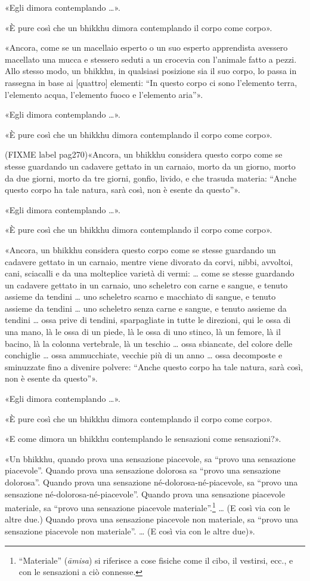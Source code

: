 «Egli dimora contemplando …».


«È pure così che un bhikkhu dimora contemplando il corpo come corpo».


«Ancora, come se un macellaio esperto o un suo esperto apprendista
avessero macellato una mucca e stessero seduti a un crocevia con
l’animale fatto a pezzi. Allo stesso modo, un bhikkhu, in qualsiasi
posizione sia il suo corpo, lo passa in rassegna in base ai [quattro]
elementi: “In questo corpo ci sono l’elemento terra, l’elemento acqua,
l’elemento fuoco e l’elemento aria”».


«Egli dimora contemplando …».


«È pure così che un bhikkhu dimora contemplando il corpo come corpo».


(FIXME label pag270)«Ancora, un bhikkhu considera questo corpo come se stesse guardando un
cadavere gettato in un carnaio, morto da un giorno, morto da due giorni,
morto da tre giorni, gonfio, livido, e che trasuda materia: “Anche
questo corpo ha tale natura, sarà così, non è esente da questo”».


«Egli dimora contemplando …».


«È pure così che un bhikkhu dimora contemplando il corpo come corpo».


«Ancora, un bhikkhu considera questo corpo come se stesse guardando un
cadavere gettato in un carnaio, mentre viene divorato da corvi, nibbi,
avvoltoi, cani, sciacalli e da una molteplice varietà di vermi: … come
se stesse guardando un cadavere gettato in un carnaio, uno scheletro con
carne e sangue, e tenuto assieme da tendini … uno scheletro scarno e
macchiato di sangue, e tenuto assieme da tendini … uno scheletro senza
carne e sangue, e tenuto assieme da tendini … ossa prive di tendini,
sparpagliate in tutte le direzioni, qui le ossa di una mano, là le ossa
di un piede, là le ossa di uno stinco, là un femore, là il bacino, là la
colonna vertebrale, là un teschio … ossa sbiancate, del colore delle
conchiglie … ossa ammucchiate, vecchie più di un anno … ossa decomposte
e sminuzzate fino a divenire polvere: “Anche questo corpo ha tale
natura, sarà così, non è esente da questo”».


«Egli dimora contemplando …».


«È pure così che un bhikkhu dimora contemplando il corpo come corpo».


«E come dimora un bhikkhu contemplando le sensazioni come sensazioni?».


«Un bhikkhu, quando prova una sensazione piacevole, sa “provo una
sensazione piacevole”. Quando prova una sensazione dolorosa sa “provo
una sensazione dolorosa”. Quando prova una sensazione
né-dolorosa-né-piacevole, sa “provo una sensazione
né-dolorosa-né-piacevole”. Quando prova una sensazione piacevole
materiale, sa “provo una sensazione piacevole
materiale”.\footnote{“Materiale” (\emph{āmisa}) si riferisce a cose fisiche come il cibo, il vestirsi, ecc., e con le sensazioni a ciò connesse.} …
(E così via con le altre due.) Quando
prova una sensazione piacevole non materiale, sa “provo una sensazione
piacevole non materiale”. … (E così via con le altre due)».


